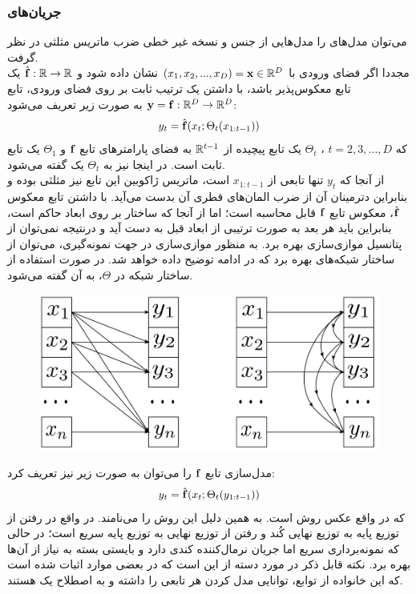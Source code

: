 \subsubsection{جریان‌های \autoregressive{}}
می‌توان مدل‌های \autoregressive{} را مدل‌هایی از جنس \normalizingflownets{} و نسخه غیر خطی ضرب ماتریس مثلثی در نظر گرفت.
\\
مجددا اگر فضای ورودی با
$(x_1, x_2, ..., x_D) = {\bf x} \in {\mathbb{R}}^D$
 نشان داده شود و
$\hat{{\bf f}} : {\mathbb{R}} \rightarrow {\mathbb{R}}$
یک تابع معکوس‌پذیر باشد، با داشتن یک ترتیب ثابت بر روی فضای ورودی، تابع \autoregressive{}
${\bf y} = {\bf f} : {\mathbb{R}}^D \rightarrow {\mathbb{R}}^D$
به صورت زیر تعریف می‌شود:
\begin{align}
y_t = \hat{{\bf f}}(x_t; \Theta_t(x_{1:t-1}))
\end{align}
که $t= 2, 3, ..., D$
، $\Theta_t$
  یک تابع پیچیده از ${\mathbb{R}}^{t-1}$ به فضای پارامترهای تابع ${\bf f}$ و $\Theta_1$ یک تابع ثابت است. در اینجا نیز به $\Theta_t$ یک \conditioner{} گفته می‌شود.
  \\
 از آنجا که $y_t$ تنها تابعی از $x_{1:t-1}$ است، ماتریس ژاکوبین این تابع نیز مثلثی بوده و بنابراین دترمینان آن از ضرب المان‌های قطری آن بدست می‌آید. با داشتن تابع معکوس $\hat{{\bf f}}$، معکوس تابع ${\bf f}$ قابل محاسبه است؛ اما از آنجا که ساختار \autoregressive{} بر روی ابعاد حاکم است، بنابراین  باید هر بعد به صورت ترتیبی از ابعاد قبل به دست آید و درنتیجه نمی‌توان از پتانسیل موازی‌سازی 
 بهره برد. به منظور موازی‌سازی در جهت نمونه‌گیری، می‌توان از ساختار شبکه‌های  بهره برد که در ادامه توضیح داده خواهد شد.
 در صورت استفاده از ساختار شبکه  در $\Theta$، به آن  گفته می‌شود.

\begin{figure}[H]
    \centering
    \includegraphics[width=.5\textwidth]{images/flow-survey2.png}
    \caption{
    }
\end{figure}

مدل‌سازی تابع \autoregressive{} 
${\bf f}$
را می‌توان به صورت زیر نیز تعریف کرد:
\begin{align}
y_t = \hat{{\bf f}}(x_t; \Theta_t(y_{1:t-1}))
\end{align}
که در واقع عکس روش  است. به همین دلیل این روش را  می‌نامند. در واقع در  رفتن از توزیع پایه به توزیع نهایی کُند و رفتن از توزیع نهایی به توزیع پایه سریع است؛ در حالی که  نمونه‌برداری سریع اما جریان نرمال‌کننده کندی دارد و بایستی بسته به نیاز از آن‌ها بهره برد. 
نکته قابل ذکر در مورد دسته \autoregressive{}  از \normalizingflownets{} این است که در  بعضی موارد اثبات شده است که این خانواده از توابع، توانایی مدل کردن هر تابعی را داشته و به اصطلاح یک
هستند.

